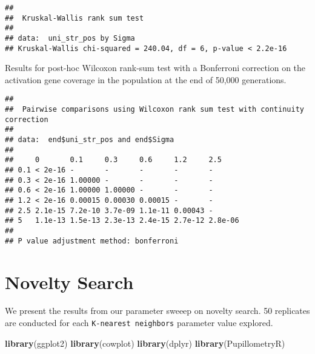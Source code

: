 \documentclass[]{book}
\newenvironment{Shaded}{\begin{snugshade}}{\end{snugshade}}
\newcommand{\DataTypeTok}[1]{\textcolor[rgb]{0.13,0.29,0.53}{#1}}
\newcommand{\KeywordTok}[1]{\textcolor[rgb]{0.13,0.29,0.53}{\textbf{#1}}}
\newcommand{\NormalTok}[1]{#1}
\newcommand{\OperatorTok}[1]{\textcolor[rgb]{0.81,0.36,0.00}{\textbf{#1}}}
\newcommand{\OtherTok}[1]{\textcolor[rgb]{0.56,0.35,0.01}{#1}}
\newcommand{\StringTok}[1]{\textcolor[rgb]{0.31,0.60,0.02}{#1}}
\begin{document}
\begin{verbatim}
## 
##  Kruskal-Wallis rank sum test
## 
## data:  uni_str_pos by Sigma
## Kruskal-Wallis chi-squared = 240.04, df = 6, p-value < 2.2e-16
\end{verbatim}

Results for post-hoc Wilcoxon rank-sum test with a Bonferroni correction on the activation gene coverage in the population at the end of 50,000 generations.

\begin{Shaded}
\end{Shaded}

\begin{verbatim}
## 
##  Pairwise comparisons using Wilcoxon rank sum test with continuity correction 
## 
## data:  end$uni_str_pos and end$Sigma 
## 
##     0       0.1     0.3     0.6     1.2     2.5    
## 0.1 < 2e-16 -       -       -       -       -      
## 0.3 < 2e-16 1.00000 -       -       -       -      
## 0.6 < 2e-16 1.00000 1.00000 -       -       -      
## 1.2 < 2e-16 0.00015 0.00030 0.00015 -       -      
## 2.5 2.1e-15 7.2e-10 3.7e-09 1.1e-11 0.00043 -      
## 5   1.1e-13 1.5e-13 2.3e-13 2.4e-15 2.7e-12 2.8e-06
## 
## P value adjustment method: bonferroni
\end{verbatim}

\hypertarget{novelty-search}{%
\chapter{Novelty Search}\label{novelty-search}}

We present the results from our parameter sweeep on novelty search.
50 replicates are conducted for each \texttt{K-nearest\ neighbors} parameter value explored.

\begin{Shaded}
\begin{Highlighting}[]
\KeywordTok{library}\NormalTok{(ggplot2)}
\KeywordTok{library}\NormalTok{(cowplot)}
\KeywordTok{library}\NormalTok{(dplyr)}
\KeywordTok{library}\NormalTok{(PupillometryR)}
\end{Highlighting}
\end{Shaded}
\end{document}
